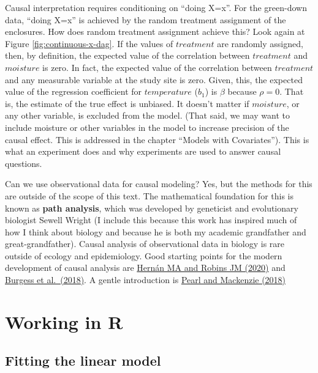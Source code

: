 \documentclass[]{book}
\begin{document}
Causal interpretation requires conditioning on ``doing X=x''. For the green-down data, ``doing X=x'' is achieved by the random treatment assignment of the enclosures. How does random treatment assignment achieve this? Look again at Figure \ref{fig:continuous-x-dag}. If the values of \(treatment\) are randomly assigned, then, by definition, the expected value of the correlation between \(treatment\) and \(moisture\) is zero. In fact, the expected value of the correlation between \(treatment\) and any measurable variable at the study site is zero. Given, this, the expected value of the regression coefficient for \(temperature\) (\(b_1\)) is \(\beta\) because \(\rho=0\). That is, the estimate of the true effect is unbiased. It doesn't matter if \(moisture\), or any other variable, is excluded from the model. (That said, we may want to include moisture or other variables in the model to increase precision of the causal effect. This is addressed in the chapter ``Models with Covariates''). This is what an experiment does and why experiments are used to answer causal questions.

Can we use observational data for causal modeling? Yes, but the methods for this are outside of the scope of this text. The mathematical foundation for this is known as \textbf{path analysis}, which was developed by geneticist and evolutionary biologist Sewell Wright (I include this because this work has inspired much of how I think about biology and because he is both my academic grandfather and great-grandfather). Causal analysis of observational data in biology is rare outside of ecology and epidemiology. Good starting points for the modern development of causal analysis are \href{https://www.hsph.harvard.edu/miguel-hernan/causal-inference-book/}{Hernán MA and Robins JM (2020)} and \href{https://www.annualreviews.org/doi/abs/10.1146/annurev-genom-083117-021731}{Burgess et al.~(2018)}. A gentle introduction is \href{https://www.basicbooks.com/titles/judea-pearl/the-book-of-why/9780465097609/}{Pearl and Mackenzie (2018)}

\hypertarget{working-in-r-1}{%
\section{Working in R}\label{working-in-r-1}}

\hypertarget{fitting-the-linear-model}{%
\subsection{Fitting the linear model}\label{fitting-the-linear-model}}
\end{document}
